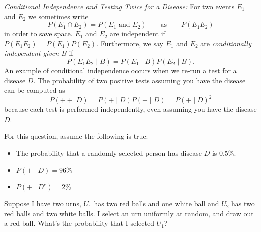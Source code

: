 \documentclass[addpoints,12pt]{exam}
\begin{document}
\begin{questions}
\begin{parts}
\vspace{1in}

\end{parts}
\addpoints

\newpage
\question[4]
\emph{Conditional Independence and Testing Twice for a Disease:} For two events $E_1$ and $E_2$ we sometimes write
\[
	P(E_1 \cap E_2) = P(E_1 \text{ and } E_2) \qquad \text{as} \qquad P(E_1E_2)
\]
in order to save space.
$E_1$ and $E_2$ are independent if $P(E_1 E_2)=P(E_1) P(E_2)$.
Furthermore, we say $E_1$ and $E_2$ are \emph{conditionally independent given $B$} if 
\[
	P(E_1 E_2 \mid B)= P(E_1\mid B) P(E_2 \mid B).
\]
An example of conditional independence occurs when we re-run a test for a disease $D$.
The probability of two positive tests assuming you have the disease can be computed as 
\[
	P(++\mid D)=P(+\mid D) P(+\mid D) = P(+ \mid D)^2
\]
because each test is performed independently, even assuming you have the disease $D$.

For this question, assume the following is true:
\begin{itemize}
	\item The probability that a randomly selected person has disease $D$ is $0.5\%$.
	\item $P(+\mid D)=96\%$
	\item $P(+ \mid D^c) = 2\%$
\end{itemize}
\noaddpoints
{}
\addpoints

\question[2] Suppose I have two urns, $U_1$ has two red balls and one white ball and $U_2$ has two red balls and two white balls.
I select an urn uniformly at random, and draw out a red ball. What's the probability that I selected $U_1$?


\end{questions}
\end{document}
